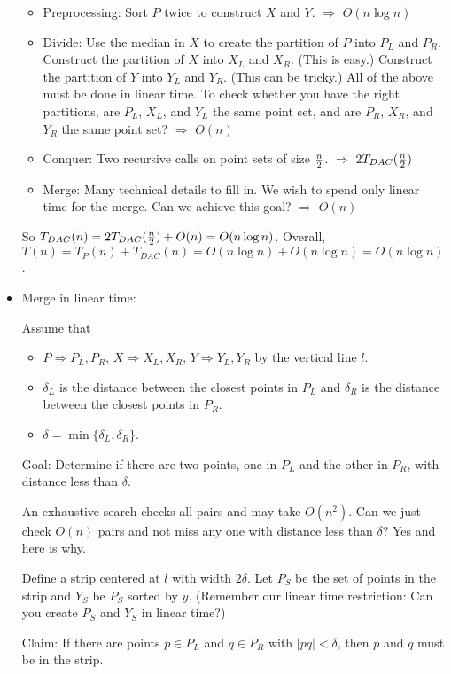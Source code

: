 \documentclass{article}
\begin{document}
\begin{itemize}
\begin{itemize}
\item Preprocessing:
Sort $P$ twice to construct $X$ and $Y$. $\Rightarrow$ $O(n\log n)$
\item Divide: Use the median in $X$ to create the partition of $P$
into $P_L$ and $P_R$. Construct the partition of $X$ into $X_L$
and $X_R$. (This is easy.) Construct the partition of $Y$ into
$Y_L$ and $Y_R$. (This can be tricky.) All of the above must be
done in linear time. To check whether you have the right partitions,
are $P_L$, $X_L$, and $Y_L$ the same point set, and are $P_R$,
$X_R$, and $Y_R$ the same point set? $\Rightarrow$ $O(n)$
\item Conquer:
Two recursive calls on point sets of size $n\over2$. $\Rightarrow$
$2T_{DAC}({n\over2})$
\item Merge: Many technical details to fill in. We wish to spend
only linear time
for the merge. Can we achieve this goal? $\Rightarrow$ $O(n)$
\end{itemize}

So $T_{DAC}(n)=2T_{DAC}({n\over2})+O(n)=O(n\log n)$.
Overall, $T(n)=T_P(n)+T_{DAC}(n)=O(n\log n)+O(n\log n)=O(n\log n)$.

\item Merge in linear time:

Assume that
\begin{itemize}
\item $P\Rightarrow P_L,P_R$, $X\Rightarrow X_L,X_R$,
$Y\Rightarrow Y_L,Y_R$ by the vertical line $l$.
\item $\delta_L$ is the distance between the closest points in
$P_L$ and $\delta_R$ is the distance between the closest points
in $P_R$.
\item $\delta=\min\{\delta_L,\delta_R\}$.
\end{itemize}

Goal: Determine if there are two points, one in $P_L$ and the other
in $P_R$, with distance less than $\delta$.

An exhaustive search checks all pairs and may take $O(n^2)$.
Can we just check $O(n)$ pairs and not miss any one with distance
less than $\delta$? Yes and here is why.

Define a strip centered at $l$ with width $2\delta$. Let $P_S$ be
the set of points in the strip and $Y_S$ be $P_S$ sorted by $y$.
(Remember our linear time restriction: Can you create $P_S$ and $Y_S$
in linear time?)

Claim: If there are points $p\in P_L$ and $q\in P_R$ with $|pq|<\delta$,
then $p$ and $q$ must be in the strip.


\end{itemize}
\end{document}
